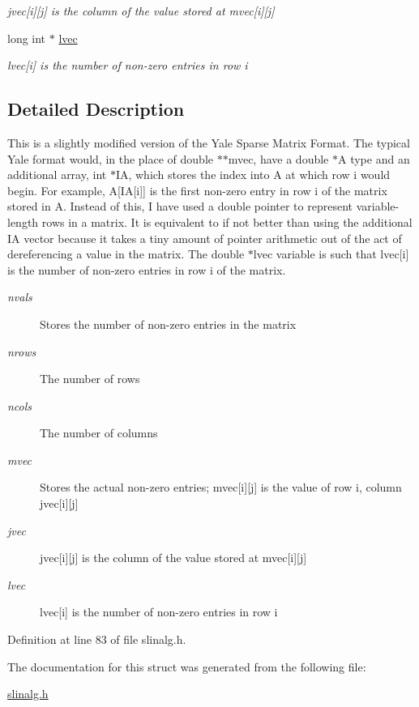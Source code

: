 \begin{CompactItemize}
\begin{CompactList}\small\item\em jvec\mbox{[}i\mbox{]}\mbox{[}j\mbox{]} is the column of the value stored at mvec\mbox{[}i\mbox{]}\mbox{[}j\mbox{]} \item\end{CompactList}\item 
\hypertarget{structsmatrix__t_3dc7bb74b29eea0d0bd5557661696940}{
long int $\ast$ \hyperlink{structsmatrix__t_3dc7bb74b29eea0d0bd5557661696940}{lvec}}
\label{structsmatrix__t_3dc7bb74b29eea0d0bd5557661696940}

\begin{CompactList}\small\item\em lvec\mbox{[}i\mbox{]} is the number of non-zero entries in row i \item\end{CompactList}\end{CompactItemize}


\subsection{Detailed Description}
This is a slightly modified version of the Yale Sparse Matrix Format. The typical Yale format would, in the place of double $\ast$$\ast$mvec, have a double $\ast$A type and an additional array, int $\ast$IA, which stores the index into A at which row i would begin. For example, A\mbox{[}IA\mbox{[}i\mbox{]}\mbox{]} is the first non-zero entry in row i of the matrix stored in A. Instead of this, I have used a double pointer to represent variable-length rows in a matrix. It is equivalent to if not better than using the additional IA vector because it takes a tiny amount of pointer arithmetic out of the act of dereferencing a value in the matrix. The double $\ast$lvec variable is such that lvec\mbox{[}i\mbox{]} is the number of non-zero entries in row i of the matrix. \begin{Desc}
\item[Parameters:]
\begin{description}
\item[{\em nvals}]Stores the number of non-zero entries in the matrix \item[{\em nrows}]The number of rows \item[{\em ncols}]The number of columns \item[{\em mvec}]Stores the actual non-zero entries; mvec\mbox{[}i\mbox{]}\mbox{[}j\mbox{]} is the value of row i, column jvec\mbox{[}i\mbox{]}\mbox{[}j\mbox{]} \item[{\em jvec}]jvec\mbox{[}i\mbox{]}\mbox{[}j\mbox{]} is the column of the value stored at mvec\mbox{[}i\mbox{]}\mbox{[}j\mbox{]} \item[{\em lvec}]lvec\mbox{[}i\mbox{]} is the number of non-zero entries in row i \end{description}
\end{Desc}


Definition at line 83 of file slinalg.h.

The documentation for this struct was generated from the following file:\begin{CompactItemize}
\item 
\hyperlink{slinalg_8h}{slinalg.h}\end{CompactItemize}
